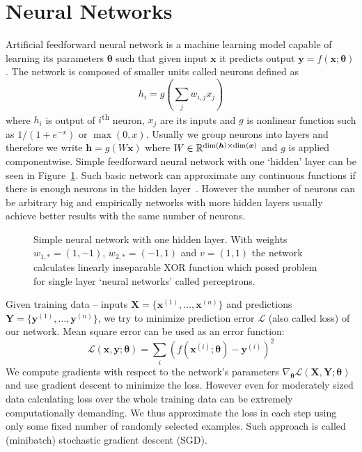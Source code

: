 \section{Neural Networks}
Artificial feedforward neural network is a machine learning model capable of learning its parameters $\bm{\theta}$ such that given input $\bm{x}$ it predicts output $\bm{y}=f(\bm{x};\bm{\theta})$. The network is composed of smaller units called neurons defined as
\begin{equation*}
h_i=g\left(\sum_{j}w_{i,j}x_j\right)
\end{equation*}
where $h_i$ is output of $i$\textsuperscript{th} neuron, $x_j$ are its inputs and $g$ is nonlinear function such as $1/(1+e^{-x})$ or $\max(0, x)$. Usually we group neurons into layers and therefore we write $\bm{h}=g(W\bm{x})$ where $W\in\mathbb{R}^{\dim(\bm{h})\times\dim(\bm{x})}$ and $g$ is applied componentwise. Simple feedforward neural network with one `hidden' layer can be seen in Figure~\ref{fig:basic_nn}. Such basic network can approximate any continuous functions if there is enough neurons in the hidden layer~\cite{HORNIK}. However the number of neurons can be arbitrary big and empirically networks with more hidden layers usually achieve better results with the same number of neurons.

\begin{figure}
	\centering
	
	
	\caption[Simple neural network]{Simple neural network with one hidden layer. With weights $w_{1,*} = (1,-1)$, $w_{2,*} = (-1,1)$ and  $v = (1,1)$ the network calculates linearly inseparable \textsf{XOR} function which posed problem for single layer `neural networks' called perceptrons.}
	\label{fig:basic_nn}
\end{figure}

Given training data -- inputs $\bm{X}=\{\bm{x}^{(1)},\dots,\bm{x}^{(n)}\}$ and predictions $\bm{Y}=\{\bm{y}^{(1)},\dots,\bm{y}^{(n)}\}$, we try to minimize prediction error $\mathcal{L}$ (also called loss) of our network. Mean square error can be used as an error function:
\begin{equation*}
\mathcal{L}(\bm{x},\bm{y};\bm{\theta})=\sum_i\left(f(\bm{x}^{(i)};\bm{\theta})-\bm{y}^{(i)}\right)^2
\end{equation*}
We compute gradients with respect to the network's parameters $\nabla_{\bm{\theta}}\mathcal{L}(\bm{X},\bm{Y};\bm{\theta})$ and use gradient descent to minimize the loss. However even for moderately sized data calculating loss over the whole training data can be extremely computationally demanding. We thus approximate the loss in each step using only some fixed number of randomly selected examples. Such approach is called (minibatch) stochastic gradient descent (SGD).

